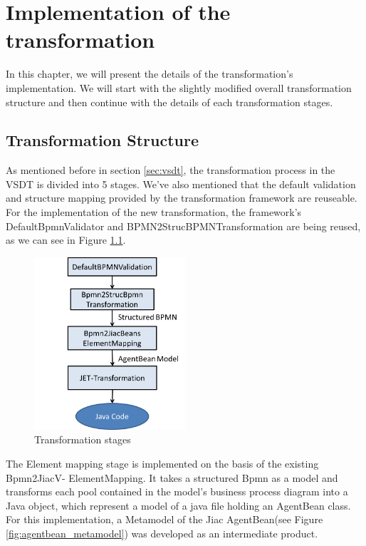 \chapter{Implementation of the transformation}
\label{chap:implementation}
In this chapter, we will present the details of the transformation's implementation. We will start with the slightly modified overall transformation structure and then continue with the details of each transformation stages.

\section{Transformation Structure}
As mentioned before in section \ref{sec:vsdt}, the transformation process in the VSDT is divided into 5 stages. We've also mentioned that the default validation and structure mapping provided by the transformation framework are reuseable. For the implementation of the new transformation, the framework's DefaultBpmnValidator and BPMN2StrucBPMNTransformation are being reused, as we can see in Figure \ref{fig:implementation_stages}.

\begin{figure}[h]
	\centering	\includegraphics[width=0.5\textwidth]{images/implementation_stages.png}
	\caption{Transformation stages}
	\label{fig:implementation_stages}
\end{figure}

The Element mapping stage is implemented on the basis of the existing Bpmn2JiacV- ElementMapping. It takes a structured Bpmn as a model and transforms each pool contained in the model's business process diagram into a Java object, which represent a model of a java file holding an AgentBean class. For this implementation, a Metamodel of the Jiac AgentBean(see Figure \ref{fig:agentbean_metamodel}) was developed as an intermediate product. 

